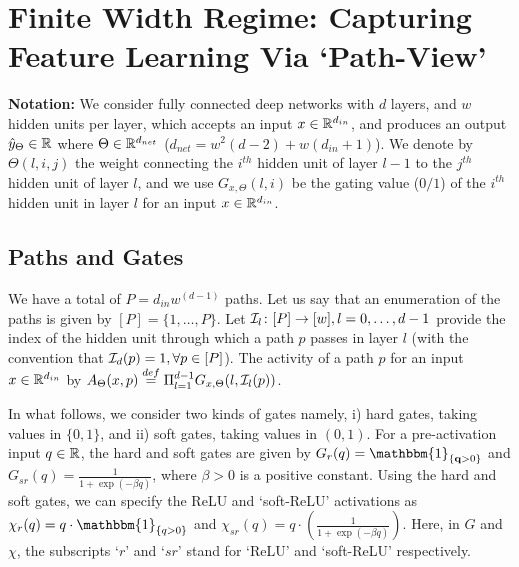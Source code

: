 \section{Finite Width Regime: Capturing Feature Learning Via `Path-View' }\label{sec:pathgate}
\textbf{Notation:} We consider fully connected deep networks with $d$ layers, and $w$ hidden units per layer, which accepts an input $x\in\mathbb{R}^{d_{in}}$, and produces an output $\hat{y}_{\Theta}\in \mathbb{R}$ where $\Theta\in\mathbb{R}^{d_{net}}$ ($d_{net}=w^2(d-2)+w(d_{in}+1)$). We denote by $\Theta(l,i,j)$ the weight connecting the $i^{th}$ hidden unit of layer $l-1$ to the $j^{th}$ hidden unit of layer $l$, and we use $G_{x,\Theta}(l,i)$ be the gating value ($0/1$) of the $i^{th}$ hidden unit in layer $l$ for an input $x\in \mathbb{R}^{d_{in}}$.
\subsection{Paths and Gates}
We have a total of $P=d_{in}w^{(d-1)}$ paths. Let us say that an enumeration of the paths is given by $[P]=\{1,\ldots,P\}$. Let $\mathcal{I}_{l}\colon [P]\rightarrow [w],l=0,\ldots,d-1$ provide the index of the hidden unit through which a path $p$ passes in layer $l$ (with the convention that $\mathcal{I}_d(p)=1,\forall p\in [P]$). The activity of a path $p$ for an input $x\in \mathbb{R}^{d_{in}}$ by $A_{\Theta}(x,p)\stackrel{def}{=}\Pi_{l=1}^{d-1} G_{x,\Theta}(l,\mathcal{I}_l(p))$.

In what follows, we consider two kinds of gates namely, i) hard gates, taking values in $\{0,1\}$, and ii) soft gates, taking values in $(0,1)$. For a pre-activation input $q\in\mathbb{R}$, the  hard and soft gates are given by $G_{r}(q)=\mathbbm{1}_{\{\q>0\}}$ and $G_{sr}(q)=\frac{1}{1+\exp(-\beta q)}$, where $\beta>0$ is a positive constant. Using the hard and soft gates, we can specify the ReLU and `soft-ReLU' activations as $\chi_{r}(q)=q\cdot\mathbbm{1}_{\{q>0\}}$ and $\chi_{sr}(q)=q\cdot\left(\frac{1}{1+\exp(-\beta q)}\right)$. Here, in $G$ and $\chi$, the subscripts `$r$' and `$sr$' stand for `ReLU' and `soft-ReLU' respectively.
